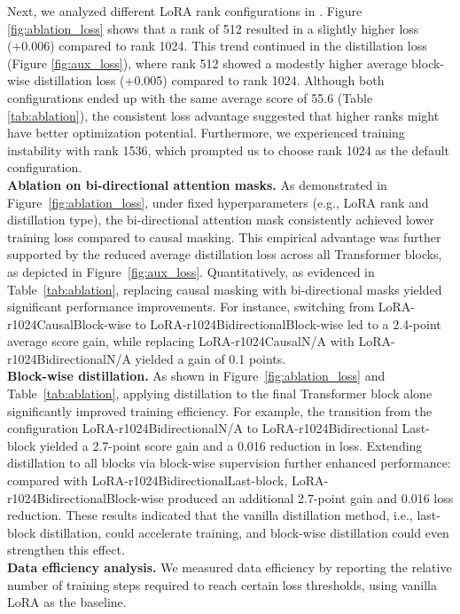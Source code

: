 Next, we analyzed different LoRA rank configurations in \model{}. Figure \ref{fig:ablation_loss} shows that a rank of 512 resulted in a slightly higher loss (+0.006) compared to rank 1024. This trend continued in the distillation loss (Figure \ref{fig:aux_loss}), where rank 512 showed a modestly higher average block-wise distillation loss (+0.005) compared to rank 1024. Although both configurations ended up with the same average score of 55.6 (Table \ref{tab:ablation}), the consistent loss advantage suggested that higher ranks might have better optimization potential. Furthermore, we experienced training instability with rank 1536, which prompted us to choose rank 1024 as the default configuration.
\\
\textbf{Ablation on bi-directional attention masks.} 
As demonstrated in Figure~\ref{fig:ablation_loss}, under fixed hyperparameters (e.g., LoRA rank and distillation type), the bi-directional attention mask consistently achieved lower training loss compared to causal masking. This empirical advantage was further supported by the reduced average distillation loss across all Transformer blocks, as depicted in Figure~\ref{fig:aux_loss}. Quantitatively, as evidenced in Table~\ref{tab:ablation}, replacing causal masking with bi-directional masks yielded significant performance improvements. For instance, switching from LoRA-r1024\textbar Causal\textbar Block-wise to LoRA-r1024\textbar Bidirectional\textbar Block-wise led to a 2.4-point average score gain, while replacing LoRA-r1024\textbar Causal\textbar N/A with LoRA-r1024\textbar Bidirectional\textbar N/A yielded a gain of 0.1 points.  
\\
\textbf{Block-wise distillation.} As shown in Figure~\ref{fig:ablation_loss} and Table~\ref{tab:ablation}, applying distillation to the final Transformer block alone significantly improved training efficiency. For example, the transition from the configuration LoRA-r1024\textbar{}Bidirectional\textbar{}N/A to LoRA-r1024\textbar{}Bidirectional\textbar{} Last-block yielded a 2.7-point score gain and a 0.016 reduction in loss. Extending distillation to all blocks via block-wise supervision further enhanced performance: compared with LoRA-r1024\textbar{}Bidirectional\textbar{}Last-block, LoRA-r1024\textbar{}Bidirectional\textbar{}Block-wise produced an additional 2.7-point gain and 0.016 loss reduction. These results indicated that the vanilla distillation method, i.e., last-block distillation, could accelerate training, and block-wise distillation could even strengthen this effect.
\\
\textbf{Data efficiency analysis.} We measured data efficiency by reporting the relative number of training steps required to reach certain loss thresholds, using vanilla LoRA as the baseline. 

